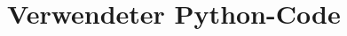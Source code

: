 \section{Verwendeter Python-Code}
\label{app:Python}
\inputminted{python}{src/reader.py}
%
%
%
%
\begin{flushright}
  \textit{\autorA}
\end{flushright}
%
%
%
%
%
%
%
%
%
%
%